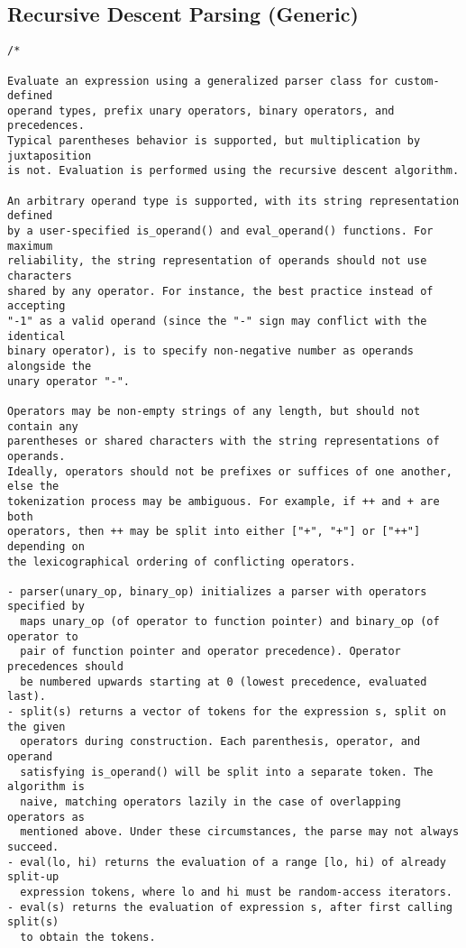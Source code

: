 \subsection{Recursive Descent Parsing (Generic)}
\begin{lstlisting}
/*

Evaluate an expression using a generalized parser class for custom-defined
operand types, prefix unary operators, binary operators, and precedences.
Typical parentheses behavior is supported, but multiplication by juxtaposition
is not. Evaluation is performed using the recursive descent algorithm.

An arbitrary operand type is supported, with its string representation defined
by a user-specified is_operand() and eval_operand() functions. For maximum
reliability, the string representation of operands should not use characters
shared by any operator. For instance, the best practice instead of accepting
"-1" as a valid operand (since the "-" sign may conflict with the identical
binary operator), is to specify non-negative number as operands alongside the
unary operator "-".

Operators may be non-empty strings of any length, but should not contain any
parentheses or shared characters with the string representations of operands.
Ideally, operators should not be prefixes or suffices of one another, else the
tokenization process may be ambiguous. For example, if ++ and + are both
operators, then ++ may be split into either ["+", "+"] or ["++"] depending on
the lexicographical ordering of conflicting operators.

- parser(unary_op, binary_op) initializes a parser with operators specified by
  maps unary_op (of operator to function pointer) and binary_op (of operator to
  pair of function pointer and operator precedence). Operator precedences should
  be numbered upwards starting at 0 (lowest precedence, evaluated last).
- split(s) returns a vector of tokens for the expression s, split on the given
  operators during construction. Each parenthesis, operator, and operand
  satisfying is_operand() will be split into a separate token. The algorithm is
  naive, matching operators lazily in the case of overlapping operators as
  mentioned above. Under these circumstances, the parse may not always succeed.
- eval(lo, hi) returns the evaluation of a range [lo, hi) of already split-up
  expression tokens, where lo and hi must be random-access iterators.
- eval(s) returns the evaluation of expression s, after first calling split(s)
  to obtain the tokens.


\end{lstlisting}
